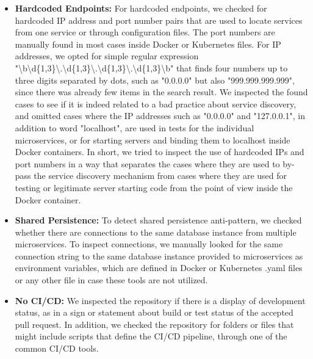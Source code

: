 \documentclass{Configuration_Files/PoliMi3i_thesis}
\begin{document}
\begin{itemize}
\begin{itemize}
        \item \textbf{Hardcoded Endpoints:} For hardcoded endpoints, we checked for hardcoded IP address and port number pairs that are used to locate services from one service or through configuration files.
        The port numbers are manually found in most cases inside Docker or Kubernetes files.
        For IP addresses, we opted for simple regular expression "\textbackslash b\textbackslash d\{1,3\}\textbackslash .\textbackslash d\{1,3\}\textbackslash .\textbackslash d\{1,3\}\textbackslash .\textbackslash d\{1,3\}\textbackslash b"
        that finds four numbers up to three digits separated by dots, such as "0.0.0.0" but also "999.999.999.999", since there was already few items in the search result.
        We inspected the found cases to see if it is indeed related to a bad practice about service discovery, and omitted cases where the IP addresses such as "0.0.0.0" and "127.0.0.1", in addition to word "localhost", are used in tests for the individual microservices, or for starting servers and binding them to localhost inside Docker containers.
        In short, we tried to inspect the use of hardcoded IPs and port numbers in a way that separates the cases where they are used to by-pass the service discovery mechanism from cases where they are used for testing or legitimate server starting code from the point of view inside the Docker container.
        
        \item \textbf{Shared Persistence:} To detect shared persistence anti-pattern, we checked whether there are connections to the same database instance from multiple microservices.
        To inspect connections, we manually looked for the same connection string to the same database instance provided to microservices as environment variables, which are defined in Docker or Kubernetes .yaml files or any other file in case these tools are not utilized.
        
        \item \textbf{No CI/CD:} We inspected the repository if there is a display of development status, as in a sign or statement about build or test status of the accepted pull request.
        In addition, we checked the repository for folders or files that might include scripts that define the CI/CD pipeline, through one of the common CI/CD tools.
        

\end{itemize}
\end{itemize}
\end{document}

